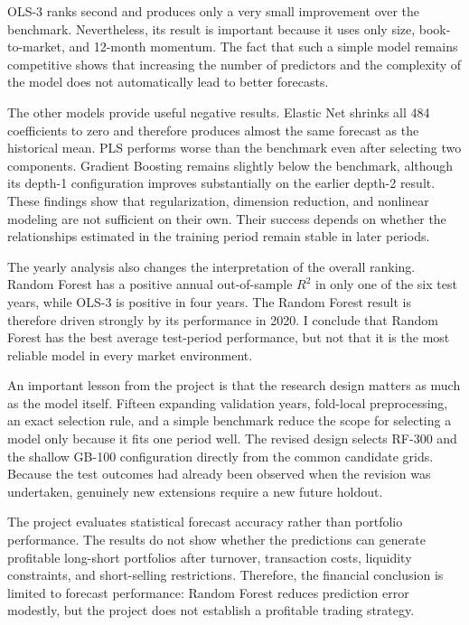 \documentclass[11pt,a4paper]{article}
\begin{document}
OLS-3 ranks second and produces only a very small improvement over the
benchmark. Nevertheless, its result is important because it uses only size,
book-to-market, and 12-month momentum. The fact that such a simple model remains
competitive shows that increasing the number of predictors and the complexity
of the model does not automatically lead to better forecasts.

The other models provide useful negative results. Elastic Net shrinks all 484
coefficients to zero and therefore produces almost the same forecast as the
historical mean. PLS performs worse than the benchmark even after selecting two
components. Gradient Boosting remains slightly below the benchmark, although
its depth-1 configuration improves substantially on the earlier depth-2 result.
These findings show that
regularization, dimension reduction, and nonlinear modeling are not sufficient
on their own. Their success depends on whether the relationships estimated in
the training period remain stable in later periods.

The yearly analysis also changes the interpretation of the overall ranking.
Random Forest has a positive annual out-of-sample \(R^2\) in only one of the
six test years, while OLS-3 is positive in four years. The Random Forest result
is therefore driven strongly by its performance in 2020. I conclude that
Random Forest has the best average test-period performance, but not that it is
the most reliable model in every market environment.

An important lesson from the project is that the research design matters as
much as the model itself. Fifteen expanding validation years, fold-local
preprocessing, an exact selection rule, and a simple benchmark reduce the scope
for selecting a model only because it fits one period well. The revised design
selects RF-300 and the shallow GB-100 configuration directly from the common
candidate grids. Because the test outcomes had already been observed when the
revision was undertaken, genuinely new extensions require a new future holdout.

The project evaluates statistical forecast accuracy rather than portfolio
performance. The results do not show whether the predictions can generate
profitable long-short portfolios after turnover, transaction costs, liquidity
constraints, and short-selling restrictions. Therefore, the financial
conclusion is limited to forecast performance: Random Forest reduces prediction
error modestly, but the project does not establish a profitable trading
strategy.
\end{document}
